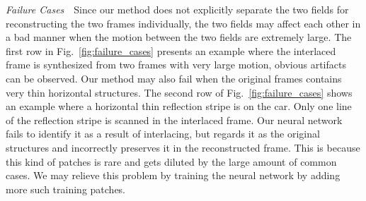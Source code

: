 \vspace{0.15in}
\noindent\emph{Failure Cases}\,\,\,\,
Since our method does not explicitly separate the two fields for reconstructing the two frames individually, the two fields may affect each other in a bad manner when the motion between the two fields are extremely large. The first row in Fig.~\ref{fig:failure_cases} presents an example where the interlaced frame is synthesized from two frames with very large motion, obvious artifacts can be observed.
Our method may also fail when the original frames contains very thin horizontal structures.
The second row of Fig.~\ref{fig:failure_cases} shows an example where a horizontal thin reflection stripe is on the car. Only one line of the reflection stripe is scanned in the interlaced frame. Our neural network fails to identify it as a result of interlacing, but regards it as the original structures and incorrectly preserves it in the reconstructed frame. 
This is because this kind of patches is rare and gets diluted by the large amount of common cases.
We may relieve this problem by training the neural network by adding more such training patches. 

